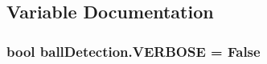 \subsection{Variable Documentation}
\subsubsection[{\texorpdfstring{V\+E\+R\+B\+O\+SE}{VERBOSE}}]{\setlength{\rightskip}{0pt plus 5cm}bool ball\+Detection.\+V\+E\+R\+B\+O\+SE = False}\hypertarget{namespaceballDetection_a647c27a849ab906ef614cb5026275f43}{}\label{namespaceballDetection_a647c27a849ab906ef614cb5026275f43}

